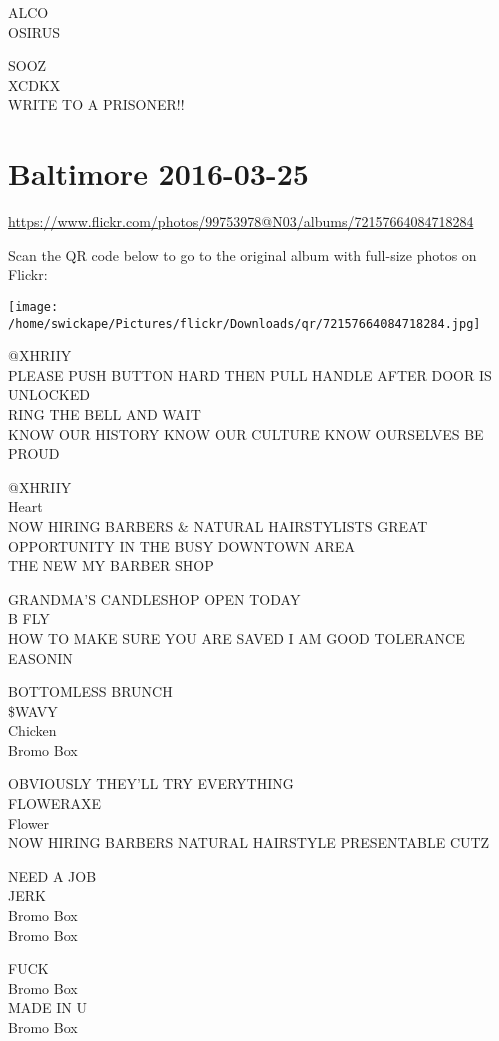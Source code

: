 \documentclass[10pt,letterpaper]{article}
\begin{document}
ALCO\\
OSIRUS

SOOZ\\
XCDKX\\
WRITE TO A PRISONER!!


\section*{Baltimore 2016-03-25}

\url{https://www.flickr.com/photos/99753978@N03/albums/72157664084718284}

Scan the QR code below to go to the original album with full-size photos on Flickr:

\texttt{[image: /home/swickape/Pictures/flickr/Downloads/qr/72157664084718284.jpg]}


@XHRIIY\\
PLEASE PUSH BUTTON HARD THEN PULL HANDLE AFTER DOOR IS UNLOCKED\\
RING THE BELL AND WAIT\\
KNOW OUR HISTORY KNOW OUR CULTURE KNOW OURSELVES BE PROUD

@XHRIIY\\
Heart\\
NOW HIRING BARBERS \& NATURAL HAIRSTYLISTS GREAT OPPORTUNITY IN THE BUSY DOWNTOWN AREA\\
THE NEW MY BARBER SHOP

GRANDMA'S CANDLESHOP OPEN TODAY\\
B FLY\\
HOW TO MAKE SURE YOU ARE SAVED I AM GOOD TOLERANCE\\
EASONIN

BOTTOMLESS BRUNCH\\
\$WAVY\\
Chicken\\
Bromo Box

OBVIOUSLY THEY'LL TRY EVERYTHING\\
FLOWERAXE\\
Flower\\
NOW HIRING BARBERS NATURAL HAIRSTYLE PRESENTABLE CUTZ

NEED A JOB\\
JERK\\
Bromo Box\\
Bromo Box

FUCK\\
Bromo Box\\
MADE IN U\\
Bromo Box
\end{document}
